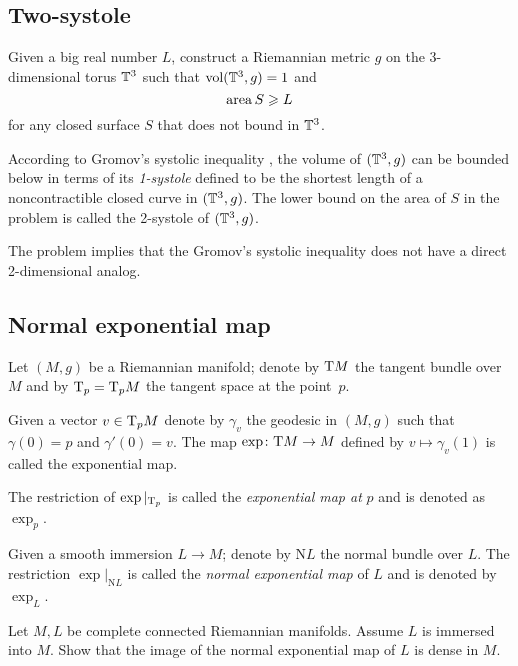 \subsection*{Two-systole}

\begin{pr} Given a big real number $L$,
construct a Riemannian metric $g$ on the 3-dimensional torus $\mathbb{T}^3$ such that $\operatorname{\rm vol}\nolimits(\mathbb{T}^3,g)=1$
and \[\operatorname{\rm area}\nolimits S\geqslant L\]
for any closed surface $S$ that does not bound in $\mathbb{T}^3$.
\end{pr}

According to Gromov's systolic inequality \cite[see][]{gromov-filling}, the volume of $(\mathbb{T}^3,g)$ can be bounded below in terms of its \emph{1-systole} defined to be the shortest length of a noncontractible closed curve in $(\mathbb{T}^3,g)$.
The lower bound on the area of $S$ in the problem is called the 2-systole of $(\mathbb{T}^3,g)$.

The problem implies that the Gromov's systolic inequality does not have a direct 2-dimensional analog.

\subsection*{Normal exponential map\easy}
\label{Normal exponential map}
\label{page:Normal exponential map}

Let $(M,g)$ be a Riemannian manifold;
denote by $\mathrm{T} M$ the tangent bundle over $M$ and by $\mathrm{T}_p=\mathrm{T}_pM$ the tangent space at the point~$p$.

Given a vector $v\in\mathrm{T}_pM$ denote by $\gamma_v$ the geodesic in $(M,g)$
such that $\gamma(0)=p$ and $\gamma'(0)=v$.
The map $\exp\colon\mathrm{T} M\to M$ defined by $v\mapsto \gamma_v(1)$ is called the exponential map.

The restriction of $\exp|_{\mathrm{T}_p}$ is called the \emph{exponential map at} $p$ and is denoted as $\exp_p$.

Given a smooth immersion $L\to M$;
denote by $\mathrm{N} L$ the normal bundle over $L$.
The restriction $\exp|_{\mathrm{N} L}$ is called the {}\emph{normal exponential map} of $L$ and is denoted by $\exp_L$.

\begin{pr}
Let $M,L$ be complete connected Riemannian manifolds.
Assume $L$ is immersed into $M$.
Show that the image  of the 
normal exponential map of $L$ is dense in $M$.
\end{pr}

